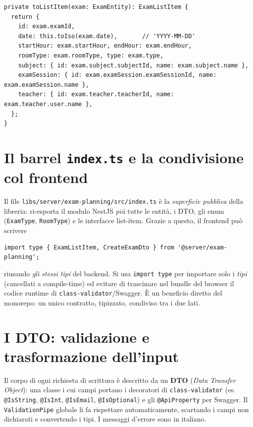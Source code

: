 \documentclass[11pt,a4paper,oneside]{report}
\newcommand{\code}[1]{\texttt{\small #1}}
\newcommand{\file}[1]{\texttt{\small #1}}
\begin{document}
\begin{lstlisting}[caption={\code{toListItem} degli esami (estratto).}]
private toListItem(exam: ExamEntity): ExamListItem {
  return {
    id: exam.examId,
    date: this.toIso(exam.date),       // 'YYYY-MM-DD'
    startHour: exam.startHour, endHour: exam.endHour,
    roomType: exam.roomType, type: exam.type,
    subject: { id: exam.subject.subjectId, name: exam.subject.name },
    examSession: { id: exam.examSession.examSessionId, name: exam.examSession.name },
    teacher: { id: exam.teacher.teacherId, name: exam.teacher.user.name },
  };
}
\end{lstlisting}

\section{Il barrel \texttt{index.ts} e la condivisione col frontend}
\label{sec:barrel}
Il file \file{libs/server/exam-planning/src/index.ts} è la \emph{superficie
pubblica} della libreria: ri-esporta il modulo NestJS \emph{più} tutte le
entità, i DTO, gli enum (\code{ExamType}, \code{RoomType}) e le interfacce
list-item. Grazie a questo, il frontend può scrivere

\begin{lstlisting}[caption={Import dei tipi del backend nel frontend.}]
import type { ExamListItem, CreateExamDto } from '@server/exam-planning';
\end{lstlisting}

riusando \emph{gli stessi tipi} del backend. Si usa \code{import type} per
importare solo i \emph{tipi} (cancellati a compile-time) ed evitare di trascinare
nel bundle del browser il codice runtime di \code{class-validator}/Swagger. È un
beneficio diretto del monorepo: un unico contratto, tipizzato, condiviso tra i
due lati.

\section{I DTO: validazione e trasformazione dell'input}
Il corpo di ogni richiesta di scrittura è descritto da un \textbf{DTO} (\emph{Data
Transfer Object}): una classe i cui campi portano i decoratori di
\code{class-validator} (es. \code{@IsString}, \code{@IsInt}, \code{@IsEmail},
\code{@IsOptional}) e gli \code{@ApiProperty} per Swagger. Il
\code{ValidationPipe} globale li fa rispettare automaticamente, scartando i
campi non dichiarati e convertendo i tipi. I messaggi d'errore sono in italiano.
\end{document}
